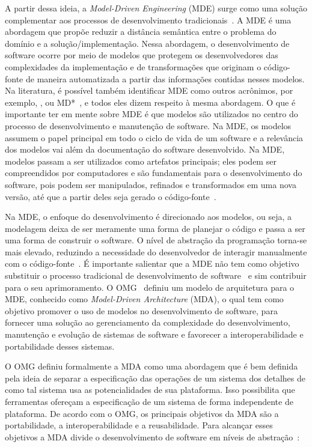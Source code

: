 A partir dessa ideia, a \textit{Model-Driven Engineering} (MDE) surge como uma solução complementar aos processos de desenvolvimento tradicionais~\cite{Lima_2007}. A MDE é uma abordagem que propõe reduzir a distância semântica entre o problema do domínio e a solução/implementação. Nessa abordagem, o desenvolvimento de software ocorre por meio de modelos que protegem os desenvolvedores das complexidades da implementação e de transformações que originam o código-fonte de maneira automatizada a partir das informações contidas nesses modelos. Na literatura, é possível também identificar MDE como outros acrônimos, por exemplo, ,  ou MD*~\cite{Kleppe:2003}, e todos eles dizem respeito à mesma abordagem. O que é importante ter em mente sobre MDE é que modelos são utilizados no centro do processo de desenvolvimento e manutenção de software. Na MDE, os modelos assumem o papel principal em todo o ciclo de vida de um software e a relevância dos modelos vai além da documentação do software desenvolvido. Na MDE, modelos passam a ser utilizados como artefatos principais; eles podem ser compreendidos por computadores e são fundamentais para o desenvolvimento do software, pois podem ser manipulados, refinados e transformados em uma nova versão, até que a partir deles seja gerado o código-fonte~\cite{Kleppe:2003, Brown_2007, Ben_Ammar}.

Na MDE, o enfoque do desenvolvimento é direcionado aos modelos, ou seja, a modelagem deixa de ser meramente uma forma de planejar o código e passa a ser uma forma de construir o software. O nível de abstração da programação torna-se mais elevado, reduzindo a necessidade do desenvolvedor de interagir manualmente com o código-fonte~\cite{Braganca_Machado}. É importante salientar que a MDE não tem como objetivo substituir o processo tradicional de desenvolvimento de software~\cite{Kleppe:2003, Brown_2007, Braganca_Machado} e sim contribuir para o seu aprimoramento. O OMG~\cite{ADM:OMG} definiu um modelo de arquitetura para o MDE, conhecido como \emph{Model-Driven Architecture} (MDA), o qual tem como objetivo promover o uso de modelos no desenvolvimento de software, para fornecer uma solução ao gerenciamento da complexidade do desenvolvimento, manutenção e evolução de sistemas de software e favorecer a interoperabilidade e portabilidade desses sistemas.

O OMG definiu formalmente a MDA como uma abordagem que é bem definida pela ideia de separar a especificação das operações de um sistema dos detalhes de como tal sistema usa as potencialidades de sua plataforma. Isso possibilita que ferramentas ofereçam a especificação de um sistema de forma independente de plataforma. De acordo com o OMG, os principais objetivos da MDA são a portabilidade, a interoperabilidade e a reusabilidade. Para alcançar esses objetivos a MDA divide o desenvolvimento de software em níveis de abstração~\cite{France_2007, Ben_Ammar}:

